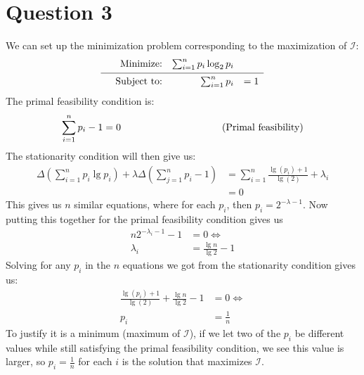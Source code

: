 \documentclass[a4paper, fleqn]{article}
\newcommand{\comment}[1]{%
  \text{\phantom{(#1)}} \tag{#1}}
\newcommand\vgap{\noalign{\vskip 0.1cm}}
\begin{document}
\section{Question 3}
We can set up the minimization problem corresponding to the maximization of $\mathcal{I}$:
\begin{equation*}
  \begin{array}{rrrl}
    &\text{Minimize:}   & \sum_{i=1}^n p_i\log_2 p_i  & \\
    \vgap
    \hline
    \vgap
    &\text{Subject to:} & \sum_{i=1}^n p_i & = 1
  \end{array}
\end{equation*}
The primal feasibility condition is:
\begin{align*}
  \sum_{i=1}^n p_i - 1 &= 0 \comment{Primal feasibility} \\
\end{align*}
The stationarity condition will then give us:
\begin{align*}
  \Delta\left(\sum_{i=1}^n p_i \lg p_i\right) + \lambda\Delta \left(\sum_{j=1}^n p_i-1\right) &= \sum_{i=1}^n
    \frac{\lg(p_i)+1}{\lg(2)} +\lambda_i \\
    &= 0
\end{align*}
This gives us $n$ similar equations, where for each $p_i$, then $p_i=2^{-\lambda-1}$. Now
putting this together for the primal feasibility condition gives us
\begin{align*}
  n 2^{-\lambda_i-1}-1&=0 \Leftrightarrow \\
  \lambda_i &= \frac{\lg n}{\lg 2}-1
\end{align*}
Solving for any $p_i$ in the $n$ equations we got from the stationarity condition gives
us:
\begin{align*}
  \frac{\lg (p_i)+1}{\lg(2)}+\frac{\lg n}{\lg 2}-1&=0 \Leftrightarrow \\
  p_i&=\frac{1}{n}
\end{align*}
To justify it is a minimum (maximum of $\mathcal{I}$), if we let two of the $p_i$
be different values while still satisfying the primal feasibility condition, we see this
value is larger, so $p_i=\frac{1}{n}$ for each $i$ is the solution that maximizes
$\mathcal{I}$.
\end{document}
